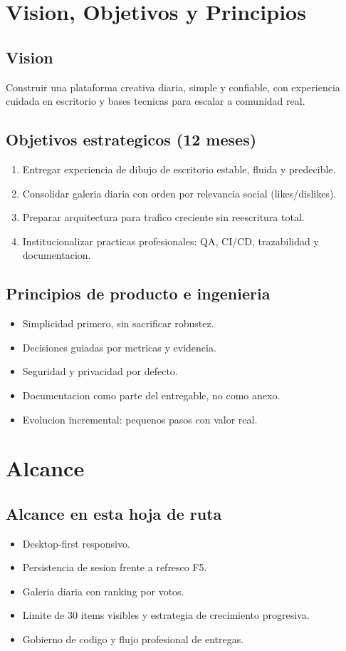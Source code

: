 \documentclass[12pt,a4paper]{article}
\begin{document}
\section{Vision, Objetivos y Principios}
\subsection{Vision}
Construir una plataforma creativa diaria, simple y confiable, con experiencia cuidada en escritorio y bases tecnicas para escalar a comunidad real.

\subsection{Objetivos estrategicos (12 meses)}
\begin{enumerate}
  \item Entregar experiencia de dibujo de escritorio estable, fluida y predecible.
  \item Consolidar galeria diaria con orden por relevancia social (likes/dislikes).
  \item Preparar arquitectura para trafico creciente sin reescritura total.
  \item Institucionalizar practicas profesionales: QA, CI/CD, trazabilidad y documentacion.
\end{enumerate}

\subsection{Principios de producto e ingenieria}
\begin{itemize}
  \item Simplicidad primero, sin sacrificar robustez.
  \item Decisiones guiadas por metricas y evidencia.
  \item Seguridad y privacidad por defecto.
  \item Documentacion como parte del entregable, no como anexo.
  \item Evolucion incremental: pequenos pasos con valor real.
\end{itemize}

\section{Alcance}
\subsection{Alcance en esta hoja de ruta}
\begin{itemize}
  \item Desktop-first responsivo.
  \item Persistencia de sesion frente a refresco F5.
  \item Galeria diaria con ranking por votos.
  \item Limite de 30 items visibles y estrategia de crecimiento progresiva.
  \item Gobierno de codigo y flujo profesional de entregas.
\end{itemize}
\end{document}
